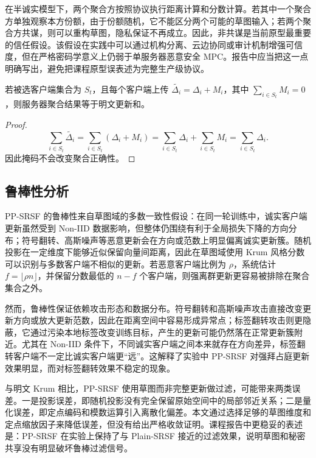 \documentclass[final]{jcr}
\begin{document}
在半诚实模型下，两个聚合方按照协议执行距离计算和分数计算。若其中一个聚合方单独观察本方份额，由于份额随机，它不能区分两个可能的草图输入；若两个聚合方共谋，则可以重构草图，隐私保证不再成立。因此，非共谋是当前原型最重要的信任假设。该假设在实践中可以通过机构分离、云边协同或审计机制增强可信度，但在严格密码学意义上仍弱于单服务器恶意安全 MPC。报告中应当把这一点明确写出，避免把课程原型误表述为完整生产级协议。

\begin{proposition}
若被选客户端集合为 $S_t$，且每个客户端上传 $\widetilde{\Delta_i}=\Delta_i+M_i$，其中 $\sum_{i\in S_t}M_i=0$，则服务器聚合结果等于明文更新和。
\end{proposition}

\begin{proof}
\[
\sum_{i\in S_t}\widetilde{\Delta_i}
=\sum_{i\in S_t}(\Delta_i+M_i)
=\sum_{i\in S_t}\Delta_i+\sum_{i\in S_t}M_i
=\sum_{i\in S_t}\Delta_i.
\]
因此掩码不会改变聚合正确性。
\end{proof}

\subsection{鲁棒性分析}
PP-SRSF 的鲁棒性来自草图域的多数一致性假设：在同一轮训练中，诚实客户端更新虽然受到 Non-IID 数据影响，但整体仍围绕有利于全局损失下降的方向分布；符号翻转、高斯噪声等恶意更新会在方向或范数上明显偏离诚实更新簇。随机投影在一定维度下能够近似保留向量间距离，因此在草图域使用 Krum 风格分数可以识别与多数客户端不相似的更新。若恶意客户端比例为 $\rho$，系统估计 $f=\lfloor \rho n\rfloor$，并保留分数最低的 $n-f$ 个客户端，则强离群更新更容易被排除在聚合集合之外。

然而，鲁棒性保证依赖攻击形态和数据分布。符号翻转和高斯噪声攻击直接改变更新方向或放大更新范数，因此在距离空间中容易形成异常点；标签翻转攻击则更隐蔽，它通过污染本地标签改变训练目标，产生的更新可能仍然落在正常更新簇附近。尤其在 Non-IID 条件下，不同诚实客户端之间本来就存在方向差异，标签翻转客户端不一定比诚实客户端更“远”。这解释了实验中 PP-SRSF 对强拜占庭更新效果明显，而对标签翻转效果不稳定的现象。

与明文 Krum 相比，PP-SRSF 使用草图而非完整更新做过滤，可能带来两类误差。一是投影误差，即随机投影没有完全保留原始空间中的局部邻近关系；二是量化误差，即定点编码和模数运算引入离散化偏差。本文通过选择足够的草图维度和定点缩放因子来降低误差，但没有给出严格收敛证明。课程报告中更稳妥的表述是：PP-SRSF 在实验上保持了与 Plain-SRSF 接近的过滤效果，说明草图和秘密共享没有明显破坏鲁棒过滤信号。
\end{document}
